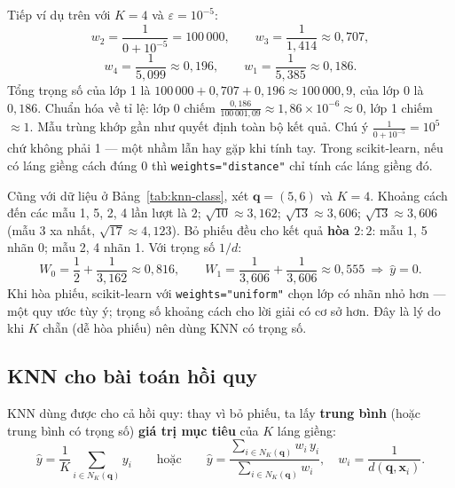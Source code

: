 \begin{example}
Tiếp ví dụ trên với $K = 4$ và $\varepsilon = 10^{-5}$:
\[
    w_2 = \frac{1}{0 + 10^{-5}} = 100\,000, \qquad
    w_3 = \frac{1}{1{,}414} \approx 0{,}707,
\]
\[
    w_4 = \frac{1}{5{,}099} \approx 0{,}196, \qquad
    w_1 = \frac{1}{5{,}385} \approx 0{,}186.
\]
Tổng trọng số của lớp 1 là $100\,000 + 0{,}707 + 0{,}196 \approx 100\,000{,}9$, của lớp 0 là $0{,}186$. Chuẩn hóa về tỉ lệ: lớp 0 chiếm $\frac{0{,}186}{100\,001{,}09} \approx 1{,}86 \times 10^{-6} \approx 0$, lớp 1 chiếm $\approx 1$. Mẫu trùng khớp gần như quyết định toàn bộ kết quả. Chú ý $\frac{1}{0 + 10^{-5}} = 10^5$ chứ không phải 1 --- một nhầm lẫn hay gặp khi tính tay. Trong scikit-learn, nếu có láng giềng cách đúng 0 thì \texttt{weights="distance"} chỉ tính các láng giềng đó.
\end{example}

\begin{example}
Cũng với dữ liệu ở Bảng~\ref{tab:knn-class}, xét $\mathbf{q} = (5, 6)$ và $K = 4$. Khoảng cách đến các mẫu 1, 5, 2, 4 lần lượt là $2$; $\sqrt{10} \approx 3{,}162$; $\sqrt{13} \approx 3{,}606$; $\sqrt{13} \approx 3{,}606$ (mẫu 3 xa nhất, $\sqrt{17} \approx 4{,}123$). Bỏ phiếu đều cho kết quả \textbf{hòa $2 : 2$}: mẫu 1, 5 nhãn 0; mẫu 2, 4 nhãn 1. Với trọng số $1/d$:
\[
    W_0 = \frac{1}{2} + \frac{1}{3{,}162} \approx 0{,}816, \qquad
    W_1 = \frac{1}{3{,}606} + \frac{1}{3{,}606} \approx 0{,}555
    \ \Rightarrow\ \hat{y} = 0 .
\]
Khi hòa phiếu, scikit-learn với \texttt{weights="uniform"} chọn lớp có nhãn nhỏ hơn --- một quy ước tùy ý; trọng số khoảng cách cho lời giải có cơ sở hơn. Đây là lý do khi $K$ chẵn (dễ hòa phiếu) nên dùng KNN có trọng số.
\end{example}

\subsection{KNN cho bài toán hồi quy}

KNN dùng được cho cả hồi quy: thay vì bỏ phiếu, ta lấy \textbf{trung bình} (hoặc trung bình có trọng số) \textbf{giá trị mục tiêu} của $K$ láng giềng:
\begin{equation}
    \hat{y} = \frac{1}{K}\sum_{i \in N_K(\mathbf{q})} y_i
    \qquad\text{hoặc}\qquad
    \hat{y} = \frac{\sum_{i \in N_K(\mathbf{q})} w_i\, y_i}{\sum_{i \in N_K(\mathbf{q})} w_i}, \quad w_i = \frac{1}{d(\mathbf{q}, \mathbf{x}_i)}.
\end{equation}

